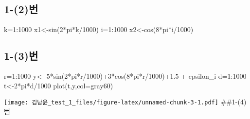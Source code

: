 \documentclass[
  12pt,
]{article}
\newenvironment{Shaded}{\begin{snugshade}}{\end{snugshade}}
\newcommand{\AttributeTok}[1]{\textcolor[rgb]{0.77,0.63,0.00}{#1}}
\newcommand{\DecValTok}[1]{\textcolor[rgb]{0.00,0.00,0.81}{#1}}
\newcommand{\FloatTok}[1]{\textcolor[rgb]{0.00,0.00,0.81}{#1}}
\newcommand{\FunctionTok}[1]{\textcolor[rgb]{0.00,0.00,0.00}{#1}}
\newcommand{\NormalTok}[1]{#1}
\newcommand{\OtherTok}[1]{\textcolor[rgb]{0.56,0.35,0.01}{#1}}
\newcommand{\SpecialCharTok}[1]{\textcolor[rgb]{0.00,0.00,0.00}{#1}}
\newcommand{\StringTok}[1]{\textcolor[rgb]{0.31,0.60,0.02}{#1}}
\begin{document}
\hypertarget{uxbc88-2}{%
\subsection{1-(2)번}\label{uxbc88-2}}

\begin{Shaded}
\begin{Highlighting}[]
\NormalTok{k}\OtherTok{=}\DecValTok{1}\SpecialCharTok{:}\DecValTok{1000}
\NormalTok{x1}\OtherTok{\textless{}{-}}\FunctionTok{sin}\NormalTok{(}\DecValTok{2}\SpecialCharTok{*}\NormalTok{pi}\SpecialCharTok{*}\NormalTok{k}\SpecialCharTok{/}\DecValTok{1000}\NormalTok{)}
\NormalTok{i}\OtherTok{=}\DecValTok{1}\SpecialCharTok{:}\DecValTok{1000}
\NormalTok{x2}\OtherTok{\textless{}{-}}\FunctionTok{cos}\NormalTok{(}\DecValTok{8}\SpecialCharTok{*}\NormalTok{pi}\SpecialCharTok{*}\NormalTok{i}\SpecialCharTok{/}\DecValTok{1000}\NormalTok{)}
\end{Highlighting}
\end{Shaded}

\hypertarget{uxbc88-3}{%
\subsection{1-(3)번}\label{uxbc88-3}}

\begin{Shaded}
\begin{Highlighting}[]
\NormalTok{r}\OtherTok{=}\DecValTok{1}\SpecialCharTok{:}\DecValTok{1000}
\NormalTok{y}\OtherTok{\textless{}{-}} \DecValTok{5}\SpecialCharTok{*}\FunctionTok{sin}\NormalTok{(}\DecValTok{2}\SpecialCharTok{*}\NormalTok{pi}\SpecialCharTok{*}\NormalTok{r}\SpecialCharTok{/}\DecValTok{1000}\NormalTok{)}\SpecialCharTok{+}\DecValTok{3}\SpecialCharTok{*}\FunctionTok{cos}\NormalTok{(}\DecValTok{8}\SpecialCharTok{*}\NormalTok{pi}\SpecialCharTok{*}\NormalTok{r}\SpecialCharTok{/}\DecValTok{1000}\NormalTok{)}\SpecialCharTok{+}\FloatTok{1.5} \SpecialCharTok{+}\NormalTok{ epsilon\_i}
\NormalTok{d}\OtherTok{=}\DecValTok{1}\SpecialCharTok{:}\DecValTok{1000}
\NormalTok{t}\OtherTok{\textless{}{-}}\DecValTok{2}\SpecialCharTok{*}\NormalTok{pi}\SpecialCharTok{*}\NormalTok{d}\SpecialCharTok{/}\DecValTok{1000}
\FunctionTok{plot}\NormalTok{(t,y,}\AttributeTok{col=}\StringTok{\textquotesingle{}gray60\textquotesingle{}}\NormalTok{)}
\end{Highlighting}
\end{Shaded}

\texttt{[image: 김남윤\_test\_1\_files/figure-latex/unnamed-chunk-3-1.pdf]}
\#\#1-(4)번
\end{document}
